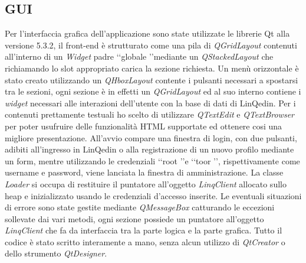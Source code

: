 \subsection*{GUI}
Per l'interfaccia grafica dell'applicazione sono state utilizzate le librerie Qt alla versione 5.3.2, il front-end è strutturato come una pila
di \textit{QGridLayout} contenuti all'interno di un \textit{Widget} padre \lq\lq globale \rq\rq mediante un \textit{QStackedLayout} che richiamando lo
slot appropriato carica la sezione richiesta.
Un menù orizzontale è stato creato utilizzando un \textit{QHboxLayout} contente i pulsanti necessari a spostarsi tra le sezioni, ogni sezione
è in effetti un \textit{QGridLayout} ed al suo interno contiene i \textit{widget} necessari alle interazioni dell'utente con la base di dati di
LinQedin. Per i contenuti prettamente testuali ho scelto di utilizzare \textit{QTextEdit} e \textit{QTextBrowser} per poter usufruire delle funzionalità
HTML supportate ed ottenere cosi una migliore presentazione.
All'avvio compare una finestra di login, con due pulsanti, adibiti all'ingresso in LinQedin o alla registrazione di un nuovo profilo mediante un form,
mentre utilizzando le credenziali \lq\lq root \rq\rq e \lq\lq toor \rq\rq, rispettivamente come username e password, viene lanciata la finestra di amministrazione.
La classe \textit{Loader} si occupa di restituire il puntatore all'oggetto \textit{LinqClient} allocato sullo heap e inizializzato usando le credenziali d'accesso inserite.
Le eventuali situazioni di errore sono state gestite mediante \textit{QMessageBox} catturando le eccezioni sollevate dai vari metodi, ogni sezione possiede un
puntatore all'oggetto \textit{LinqClient} che fa da interfaccia tra la parte logica e la parte grafica.
Tutto il codice è stato scritto interamente a mano, senza alcun utilizzo di \textit{QtCreator} o dello strumento \textit{QtDesigner}.
